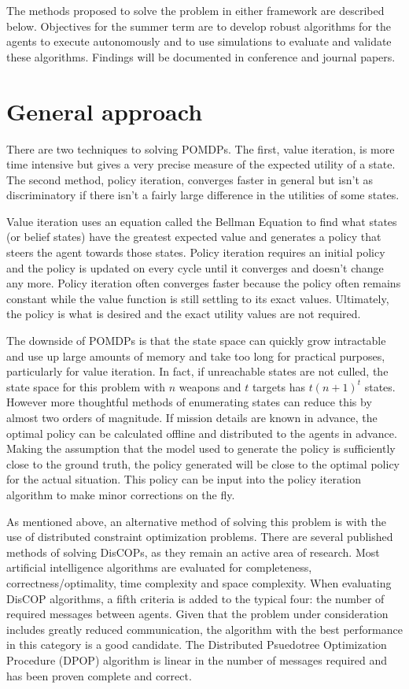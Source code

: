 \documentclass{article}
\begin{document}
The methods proposed to solve the problem in either framework are described below. Objectives for the summer term are to develop robust algorithms for the agents to execute autonomously and to use simulations to evaluate and validate these algorithms. Findings will be documented in conference and journal papers.\\

\section{General approach}
There are two techniques to solving POMDPs. The first, value iteration, is more time intensive but gives a very precise measure of the expected utility of a state. The second method, policy iteration, converges faster in general but isn't as discriminatory if there isn't a fairly large difference in the utilities of some states.

Value iteration uses an equation called the Bellman Equation to find what states (or belief states) have the greatest expected value and generates a policy that steers the agent towards those states. Policy iteration requires an initial policy and the policy is updated on every cycle until it converges and doesn't change any more. Policy iteration often converges faster because the policy often remains constant while the value function is still settling to its exact values. Ultimately, the policy is what is desired and the exact utility values are not required.

The downside of POMDPs is that the state space can quickly grow intractable and use up large amounts of memory and take too long for practical purposes, particularly for value iteration. In fact, if unreachable states are not culled, the state space for this problem with $n$ weapons and $t$ targets has $t\left(n+1\right)^{t}$ states. However more thoughtful methods of enumerating states can reduce this by almost two orders of magnitude. If mission details are known in advance, the optimal policy can be calculated offline and distributed to the agents in advance. Making the assumption that the model used to generate the policy is sufficiently close to the ground truth, the policy generated will be close to the optimal policy for the actual situation. This policy can be input into the policy iteration algorithm to make minor corrections on the fly.

As mentioned above, an alternative method of solving this problem is with the use of distributed constraint optimization problems. There are several published methods of solving DisCOPs, as they remain an active area of research. Most artificial intelligence algorithms are evaluated for completeness, correctness/optimality, time complexity and space complexity. When evaluating DisCOP algorithms, a fifth criteria is added to the typical four: the number of required messages between agents. Given that the problem under consideration includes greatly reduced communication, the algorithm with the best performance in this category is a good candidate. The Distributed Psuedotree Optimization Procedure (DPOP) algorithm is linear in the number of messages required and has been proven complete and correct.\\
\end{document}
